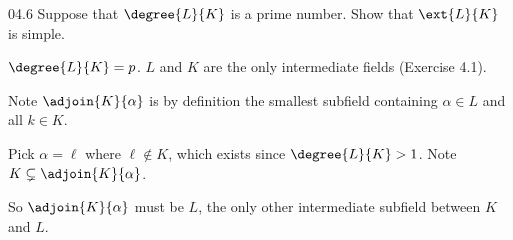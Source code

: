 \documentclass[11pt]{article}
\begin{document}
\begin{problem}{04.6}
  Suppose that $\degree{L}{K}$ is a prime number. Show that $\ext{L}{K}$ is
  simple.
\end{problem}
\begin{solution}
  $\degree{L}{K} = p$. $L$ and $K$ are the only intermediate fields
  (Exercise 4.1).

  Note $\adjoin{K}{\alpha}$ is by definition the smallest subfield containing
  $\alpha \in L$ and all $k \in K$.

  Pick $\alpha = \ell$ where $\ell \notin K$, which exists since
  $\degree{L}{K} > 1$. Note $K \subsetneq \adjoin{K}{\alpha}$.

  So $\adjoin{K}{\alpha}$ must be $L$, the only other intermediate subfield
  between $K$ and $L$.
\end{solution}
\end{document}
